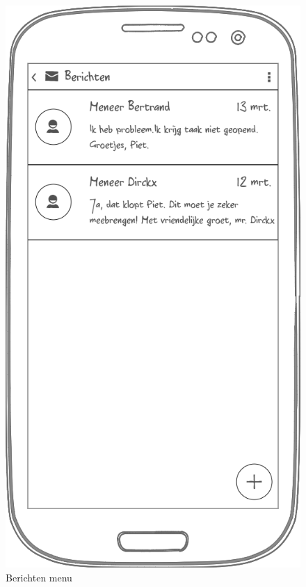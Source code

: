 \documentclass[a4paper]{article}
\begin{document}
\begin{appendices}
\begin{figure}[H]
  \centerline{\includegraphics[width=\textwidth*4/5]{mobiel_berichten}}
  \caption{Berichten menu}
  \label{fig:mobiel_berichten}
\end{figure}


\end{appendices}
\end{document}
